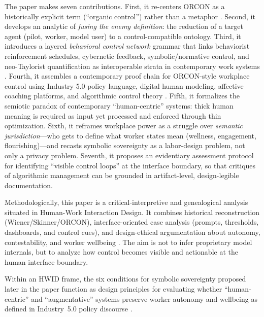 \documentclass[runningheads]{llncs}
\begin{document}
The paper makes seven contributions. First, it re-centers ORCON as a historically explicit term (``organic control'') rather than a metaphor \cite{skinner1960pigeons}. Second, it develops an analytic of \emph{fusing the enemy definition}: the reduction of a target agent (pilot, worker, model user) to a control-compatible ontology. Third, it introduces a layered \emph{behavioral control network} grammar that links behaviorist reinforcement schedules, cybernetic feedback, symbolic/normative control, and neo-Taylorist quantification as interoperable strata in contemporary work systems \cite{wiener1948cybernetics,geertz1973interpretation,kellogg2020algorithms}. Fourth, it assembles a contemporary proof chain for ORCON-style workplace control using Industry 5.0 policy language, digital human modeling, affective coaching platforms, and algorithmic control theory \cite{breque2021industry,siemensPSXHuman,siemensHumanAdvanced,cxtoday2022cogito,kellogg2020algorithms}. Fifth, it formalizes the semiotic paradox of contemporary ``human-centric'' systems: thick human meaning is required as input yet processed and enforced through thin optimization. Sixth, it reframes workplace power as a struggle over \emph{semantic jurisdiction}---who gets to define what worker states mean (wellness, engagement, flourishing)---and recasts symbolic sovereignty as a labor-design problem, not only a privacy problem. Seventh, it proposes an evidentiary assessment protocol for identifying ``visible control loops'' at the interface boundary, so that critiques of algorithmic management can be grounded in artifact-level, design-legible documentation.

Methodologically, this paper is a critical-interpretive and genealogical analysis situated in Human-Work Interaction Design. It combines historical reconstruction (Wiener/Skinner/ORCON), interface-oriented case analysis (prompts, thresholds, dashboards, and control cues), and design-ethical argumentation about autonomy, contestability, and worker wellbeing \cite{geertz1973interpretation,kellogg2020algorithms,disalvo2012adversarial}. The aim is not to infer proprietary model internals, but to analyze how control becomes visible and actionable at the human interface boundary.

Within an HWID frame, the six conditions for symbolic sovereignty proposed later in the paper function as design principles for evaluating whether ``human-centric'' and ``augmentative'' systems preserve worker autonomy and wellbeing as defined in Industry~5.0 policy discourse \cite{breque2021industry,hwid2026cfp}.
\end{document}
